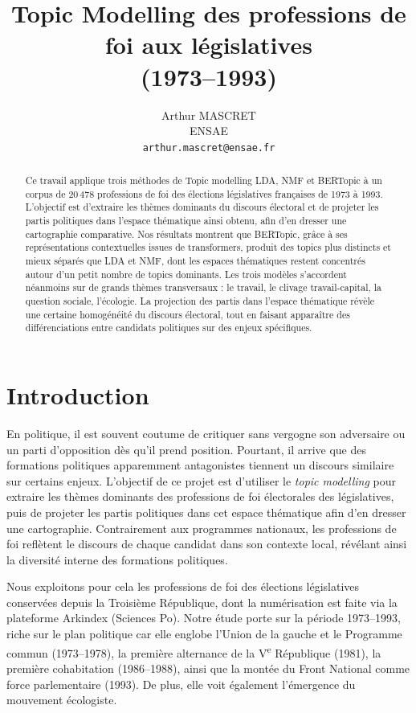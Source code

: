 \documentclass{article}
\title{Topic Modelling des professions de foi aux législatives\\(1973--1993)}
\author{%
  Arthur MASCRET \\
  ENSAE \\
  \texttt{arthur.mascret@ensae.fr}
}
\begin{document}
\maketitle

\begin{abstract}
Ce travail applique trois méthodes de Topic modelling LDA, NMF et BERTopic à un corpus de 20\,478 professions de foi des élections législatives françaises de 1973 à 1993. L'objectif est d'extraire les thèmes dominants du discours électoral et de projeter les partis politiques dans l'espace thématique ainsi obtenu, afin d'en dresser une cartographie comparative. Nos résultats montrent que BERTopic, grâce à ses représentations contextuelles issues de transformers, produit des topics plus distincts et mieux séparés que LDA et NMF, dont les espaces thématiques restent concentrés autour d'un petit nombre de topics dominants. Les trois modèles s'accordent néanmoins sur de grands thèmes transversaux : le travail, le clivage travail-capital, la question sociale, l'écologie. La projection des partis dans l'espace thématique révèle une certaine homogénéité du discours électoral, tout en faisant apparaître des différenciations entre candidats politiques sur des enjeux spécifiques.
\end{abstract}

\section{Introduction}

En politique, il est souvent coutume de critiquer sans vergogne son adversaire ou un parti d'opposition dès qu'il prend position. Pourtant, il arrive que des formations politiques apparemment antagonistes tiennent un discours similaire sur certains enjeux. L'objectif de ce projet est d'utiliser le \textit{topic modelling} pour extraire les thèmes dominants des professions de foi électorales des législatives, puis de projeter les partis politiques dans cet espace thématique afin d'en dresser une cartographie. Contrairement aux programmes nationaux, les professions de foi reflètent le discours de chaque candidat dans son contexte local, révélant ainsi la diversité interne des formations politiques.

Nous exploitons pour cela les professions de foi des élections législatives conservées depuis la Troisième République, dont la numérisation est faite via la plateforme Arkindex (Sciences Po). Notre étude porte sur la période 1973--1993, riche sur le plan politique car elle englobe l'Union de la gauche et le Programme commun (1973--1978), la première alternance de la V\textsuperscript{e} République (1981), la première cohabitation (1986--1988), ainsi que la montée du Front National comme force parlementaire (1993). De plus, elle voit également l'émergence du mouvement écologiste.
\end{document}
